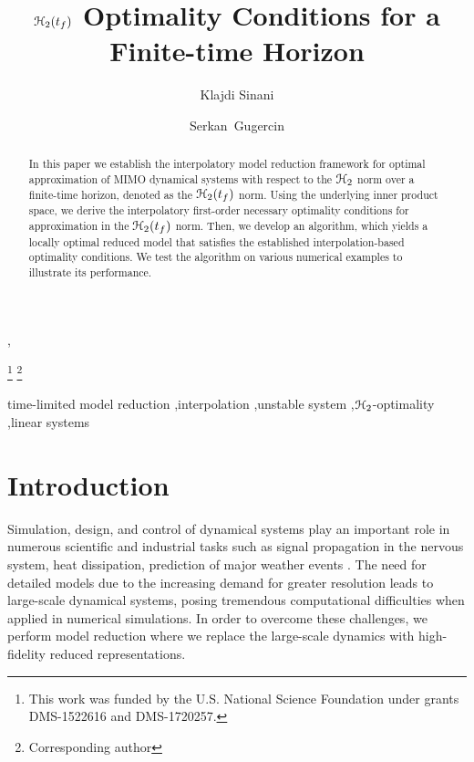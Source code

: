 \documentclass[twocolumn]{autart}
\begin{document}
\begin{frontmatter}
\title{ {$\EuScript{H}_2(t_f)$ Optimality Conditions for a Finite-time Horizon} }
\author{Klajdi Sinani} ,
\author{Serkan~Gugercin} 

\thanks[mytitlenote]{This work was funded by the U.S. National Science Foundation under grants DMS-1522616 and  DMS-1720257.}
\thanks[cor]{Corresponding author }
\address{Department of Mathematics, Virginia Polytechnic Institute and State University, Blacksburg, VA 24061, USA}

\begin{abstract} 
In this paper we establish the interpolatory model reduction framework for optimal approximation of MIMO dynamical systems with respect to the $\EuScript{H}_2$ norm over a finite-time horizon, denoted as the $\EuScript{H}_2(t_f)$ norm.
Using the underlying inner product space, we derive the interpolatory first-order necessary optimality conditions for approximation in the $\EuScript{H}_2(t_f)$ norm. Then,  we  develop an algorithm, which yields a locally optimal reduced model that satisfies the established interpolation-based optimality conditions. We test the algorithm on various numerical examples to illustrate its performance.
\end{abstract}

\begin{keyword}
 time-limited model reduction \sep interpolation \sep unstable system \sep $\EuScript{H}_2$-optimality \sep linear systems 
\end{keyword}

\end{frontmatter}
\section{Introduction}
Simulation, design, and control of dynamical systems play an important role in numerous scientific and industrial tasks such as signal propagation in the nervous system\cite{Steve Cox}, heat dissipation, prediction of major weather events \cite{BoyP11,Sha03,Ant05}. The need for  detailed  models due to the increasing demand for greater resolution leads to  
large-scale dynamical systems, posing tremendous computational difficulties when applied in numerical simulations. In order to overcome these challenges, we perform  model reduction where we replace the large-scale dynamics with high-fidelity reduced representations.
\end{document}
